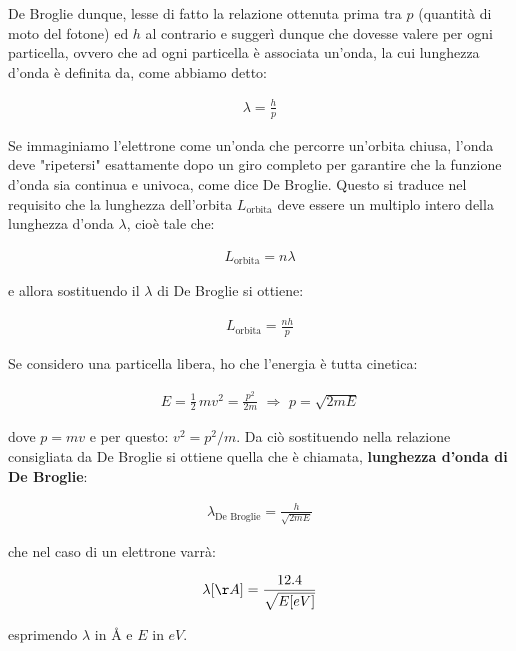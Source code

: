 	De Broglie dunque, lesse di fatto la relazione ottenuta prima tra $p$ (quantità di moto del fotone) ed $h$ al contrario e suggerì dunque che dovesse valere per ogni particella, ovvero che ad ogni particella è associata un'onda, la cui lunghezza d'onda è definita da, come abbiamo detto:
	
\begin{align*}
	\lambda = \frac{h}{p}
\end{align*}

	Se immaginiamo l'elettrone come un'onda che percorre un'orbita chiusa, l'onda deve "ripetersi" esattamente dopo un giro completo per garantire che la funzione d'onda sia continua e univoca, come dice De Broglie. Questo si traduce nel requisito che la lunghezza dell'orbita $L_{\text{orbita}}$ deve essere un multiplo intero della lunghezza d'onda $\lambda$, cioè tale che:

\begin{align*}
	L_{\text{orbita}} = n\lambda 
\end{align*}

	e allora sostituendo il $\lambda$ di De Broglie si ottiene:

\begin{align*}
	L_{\text{orbita}} = \frac{nh}{p}
\end{align*}

	Se considero una particella libera, ho che l'energia è tutta cinetica:
	
\begin{align*}
	E = \frac{1}{2} \, mv^2 = \frac{p^2}{2m} \, \, \Rightarrow \, \, p = \sqrt{2mE}
\end{align*}

	dove $p = mv$ e per questo: $v^2 = p^2/m$. Da ciò sostituendo nella relazione consigliata da De Broglie si ottiene quella che è chiamata, \textbf{lunghezza d'onda di De Broglie}:

\begin{mydef}
\begin{align*}
	\lambda_{\text{De Broglie}} = \frac{h}{\sqrt{2mE}}
\end{align*}
\end{mydef}

	che nel caso di un elettrone varrà:

\begin{align*}
	\lambda\qty[Å] = \frac{12.4}{\sqrt{E\qty[eV]}}
\end{align*}

	esprimendo $\lambda$ in $Å$ e $E$ in $eV$.
	
